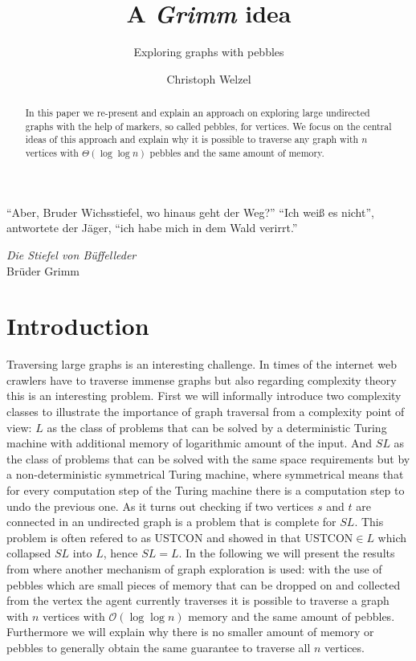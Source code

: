 \documentclass[draft,oneside]{scrartcl}
\begin{document}
\setlength{\epigraphwidth}{0.7\textwidth}

\title{A \emph{Grimm} idea}
\subtitle{Exploring graphs with pebbles}
\author{Christoph Welzel}
\maketitle

\begin{abstract}
  In this paper we re-present and explain an approach on exploring large
  undirected graphs with the help of markers, so called pebbles, for vertices.
  We focus on the central ideas of this approach and explain why it is possible
  to traverse any graph with $n$ vertices with $\Theta(\log \log n)$ pebbles
  and the same amount of memory.
\end{abstract}

\epigraph{\enquote{Aber, Bruder Wichsstiefel, wo hinaus geht der Weg?} %
  \enquote{Ich weiß es nicht}, antwortete der Jäger, %
  \enquote{ich habe mich in dem Wald verirrt.}}%
  {\emph{Die Stiefel von Büffelleder}\\Brüder Grimm}
\section{Introduction}
Traversing large graphs is an interesting challenge. In times of the internet
web crawlers have to traverse immense graphs but also regarding complexity
theory this is an interesting problem. First we will informally introduce two
complexity classes to illustrate the importance of graph traversal from a
complexity point of view: $L$ as the class of problems that can be solved by
a deterministic Turing machine with additional memory of logarithmic amount
of the input. And $SL$ as the class of problems that can be solved with the
same space requirements but by a non-deterministic symmetrical Turing machine,
where symmetrical means that for every computation step of the Turing machine
there is a computation step to undo the previous one. As it turns out checking
if two vertices $s$ and $t$ are connected in an undirected graph is a problem
that is complete for $SL$. This problem is often refered to as
$\mathrm{USTCON}$ and \citeauthor{logspacealg} showed in \cite{logspacealg}
that $\mathrm{USTCON}\in L$ which collapsed $SL$ into $L$, hence $SL = L$.
In the following we will present the results from \cite{pebbles} where another
mechanism of graph exploration is used: with the use of pebbles which are small
pieces of memory that can be dropped on and collected from the vertex the
agent currently traverses it is possible to traverse a graph with $n$ vertices
with $\mathcal{O}(\log\log n)$ memory and the same amount of pebbles.
Furthermore we will explain why there is no smaller amount of memory or pebbles
to generally obtain the same guarantee to traverse all $n$ vertices.
\end{document}
